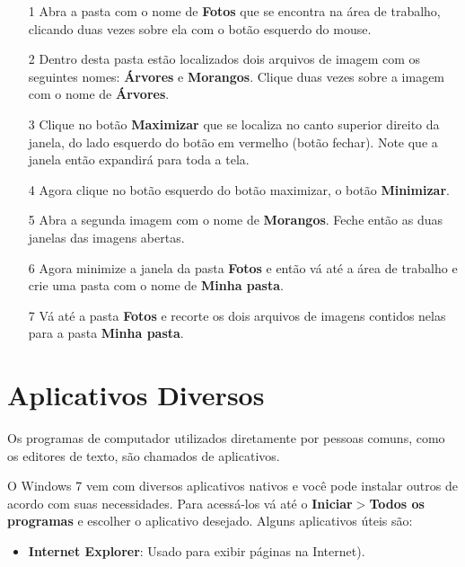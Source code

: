 \documentclass[12pt]{article}
\begin{document}
		\begin{itemize}
			
			\item[1] Abra a pasta com o nome de {\bf Fotos} que se encontra na área de trabalho, clicando duas vezes sobre ela com o botão esquerdo do mouse. 
			
			\item[2] Dentro desta pasta estão localizados dois arquivos de imagem com os seguintes nomes: {\bf Árvores} e {\bf Morangos}. Clique duas vezes sobre a imagem com o nome de {\bf Árvores}.
			
			\item[3] Clique no botão {\bf Maximizar} que se localiza no canto superior direito da janela, do lado esquerdo do botão em vermelho (botão fechar). Note que a janela então expandirá para toda a tela.
			
			\item[4] Agora clique no botão esquerdo do botão maximizar, o botão {\bf Minimizar}.
			
			\item[5] Abra a segunda imagem com o nome de {\bf Morangos}. Feche então as duas janelas das imagens abertas.
			
			\item[6] Agora minimize a janela da pasta {\bf Fotos} e então vá até a área de trabalho e crie uma pasta com o nome de {\bf Minha pasta}. 
			
			\item[7] Vá até a pasta {\bf Fotos} e recorte os dois arquivos de imagens contidos nelas para a pasta {\bf Minha pasta}.
				
		\end{itemize}
		
		
		\section{Aplicativos Diversos}
	
			Os programas de computador utilizados diretamente por pessoas comuns, como os editores de texto, são chamados de aplicativos.
			
			O Windows 7 vem com diversos aplicativos nativos e você pode instalar outros de acordo com suas necessidades. Para acessá-los vá até o {\bf Iniciar$>$Todos os programas} e escolher o aplicativo desejado. Alguns aplicativos úteis são:
			
			\begin{itemize}
				\item{
					{\bf Internet Explorer}: Usado para exibir páginas na Internet).
			}
			\end{itemize}
				
			
\end{document}
